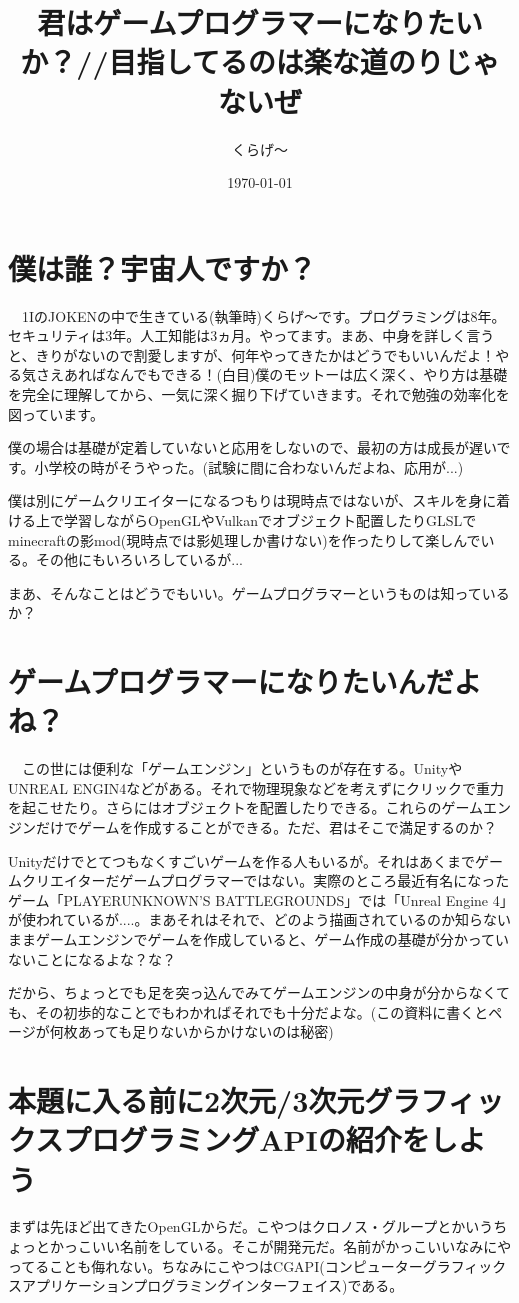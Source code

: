 \documentclass[12pt,a4paper]{jsarticle}
\title{君はゲームプログラマーになりたいか？//目指してるのは楽な道のりじゃないぜ}
\author{くらげ～}
\date{\today}
\begin{document}
\maketitle
\section{僕は誰？宇宙人ですか？}
　1IのJOKENの中で生きている(執筆時)くらげ～です。プログラミングは8年。セキュリティは3年。人工知能は3ヵ月。やってます。まあ、中身を詳しく言うと、きりがないので割愛しますが、何年やってきたかはどうでもいいんだよ！やる気さえあればなんでもできる！(白目)僕のモットーは広く深く、やり方は基礎を完全に理解してから、一気に深く掘り下げていきます。それで勉強の効率化を図っています。

僕の場合は基礎が定着していないと応用をしないので、最初の方は成長が遅いです。小学校の時がそうやった。(試験に間に合わないんだよね、応用が...)

僕は別にゲームクリエイターになるつもりは現時点ではないが、スキルを身に着ける上で学習しながらOpenGLやVulkanでオブジェクト配置したりGLSLでminecraftの影mod(現時点では影処理しか書けない)を作ったりして楽しんでいる。その他にもいろいろしているが...

まあ、そんなことはどうでもいい。ゲームプログラマーというものは知っているか？


\section{ゲームプログラマーになりたいんだよね？}
　この世には便利な「ゲームエンジン」というものが存在する。UnityやUNREAL ENGIN4などがある。それで物理現象などを考えずにクリックで重力を起こせたり。さらにはオブジェクトを配置したりできる。これらのゲームエンジンだけでゲームを作成することができる。ただ、君はそこで満足するのか？

Unityだけでとてつもなくすごいゲームを作る人もいるが。それはあくまでゲームクリエイターだゲームプログラマーではない。実際のところ最近有名になったゲーム「PLAYERUNKNOWN'S BATTLEGROUNDS」では「Unreal Engine 4」が使われているが....。まあそれはそれで、どのよう描画されているのか知らないままゲームエンジンでゲームを作成していると、ゲーム作成の基礎が分かっていないことになるよな？な？

だから、ちょっとでも足を突っ込んでみてゲームエンジンの中身が分からなくても、その初歩的なことでもわかればそれでも十分だよな。(この資料に書くとページが何枚あっても足りないからかけないのは秘密)


\section{本題に入る前に2次元/3次元グラフィックスプログラミングAPIの紹介をしよう}
 まずは先ほど出てきたOpenGLからだ。こやつはクロノス・グループとかいうちょっとかっこいい名前をしている。そこが開発元だ。名前がかっこいいなみにやってることも侮れない。ちなみにこやつはCGAPI(コンピューターグラフィックスアプリケーションプログラミングインターフェイス)である。
\end{document}

